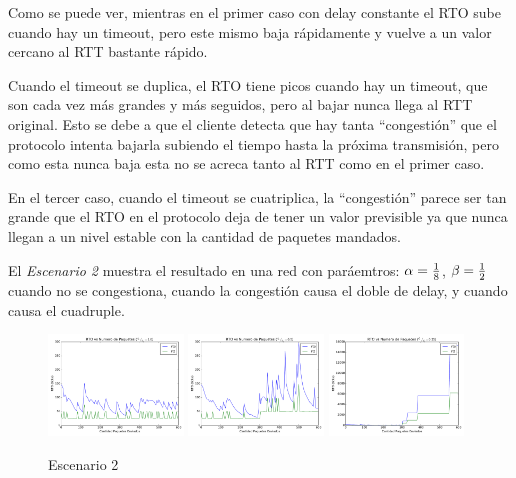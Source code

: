 		Como se puede ver, mientras en el primer caso con delay constante el RTO
		sube cuando hay un timeout, pero este mismo baja r\'apidamente y vuelve
		a un valor cercano al RTT bastante r\'apido.

		Cuando el timeout se duplica, el RTO tiene picos cuando hay un timeout,
		que son cada vez m\'as grandes y m\'as seguidos, pero al bajar nunca
		llega al RTT original. Esto se debe a que el cliente detecta que hay
		tanta ``congesti\'on'' que el protocolo intenta bajarla subiendo el
		tiempo hasta la pr\'oxima transmisi\'on, pero como esta nunca baja esta
		no se acreca tanto al RTT como en el primer caso.

		En el tercer caso, cuando el timeout se cuatriplica, la ``congesti\'on''
		parece ser tan grande que el RTO en el protocolo deja de tener un valor
		previsible ya que nunca llegan a un nivel estable con la cantidad de
		paquetes mandados.
  
        El \emph{Escenario 2} muestra el resultado en una red con
        par\'aemtros: $\alpha={{1}\over{8}}$, $\beta={{1}\over{2}}$ 
        cuando no se congestiona, cuando la congesti\'on causa el doble de
        delay, y cuando causa el cuadruple.

        \begin{figure}[H]
            \center
	        
		    \includegraphics[width=0.32\textwidth]{imagenes/congestionb_1.pdf}
		    \includegraphics[width=0.32\textwidth]{imagenes/congestionb_2.pdf}
		    \includegraphics[width=0.32\textwidth]{imagenes/congestionb_4.pdf}

            \caption*{Escenario 2}
	
        \end{figure}          

